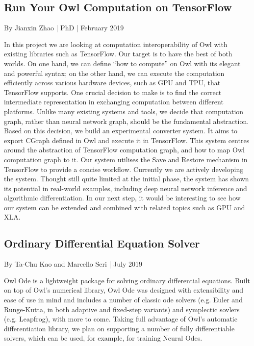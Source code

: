 \hypertarget{Run Your Owl Computation on TensorFlow}{%
\subsection{Run Your Owl Computation on TensorFlow}\label{theses-tf}}

By Jianxin Zhao | PhD | February 2019

In this project we are looking at computation interoperability of Owl with existing libraries such as TensorFlow. Our target is to have the best of both worlds. On one hand, we can define “how to compute” on Owl with its elegant and powerful syntax; on the other hand, we can execute the computation efficiently across various hardware devices, such as GPU and TPU, that TensorFlow supports. One crucial decision to make is to find the correct intermediate representation in exchanging computation between different platforms. Unlike many existing systems and tools, we decide that computation graph, rather than neural network graph, should be the fundamental abstraction. Based on this decision, we build an experimental converter system. It aims to export CGraph defined in Owl and execute it in TensorFlow. This system centres around the abstraction of TensorFlow computation graph, and how to map Owl computation graph to it. Our system utilises the Save and Restore mechanism in TensorFlow to provide a concise workflow. Currently we are actively developing the system. Thought still quite limited at the initial phase, the system has shown its potential in real-world examples, including deep neural network inference and algorithmic differentiation. In our next step, it would be interesting to see how our system can be extended and combined with related topics such as GPU and XLA.


\hypertarget{Ordinary Differential Equation Solver}{%
\subsection{Ordinary Differential Equation Solver}\label{theses-owlde}}

By Ta-Chu Kao and Marcello Seri | July 2019

Owl Ode is a lightweight package for solving ordinary differential equations. Built on top of Owl's numerical library, Owl Ode was designed with extensibility and ease of use in mind and includes a number of classic ode solvers (e.g. Euler and Runge-Kutta, in both adaptive and fixed-step variants) and symplectic sovlers (e.g. Leapfrog), with more to come. Taking full advantage of Owl's automatic differentiation library, we plan on supporting a number of fully differentiable solvers, which can be used, for example, for training Neural Odes.

